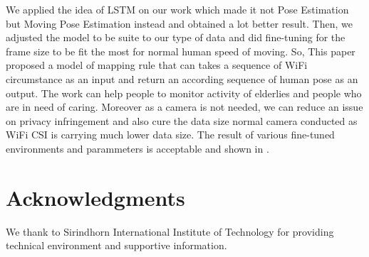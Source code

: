 \documentclass[10pt,letterpaper]{article}
\begin{document}
	
	We applied the idea of LSTM on our work which made it not Pose Estimation but Moving Pose Estimation instead and obtained a lot better result. Then, we adjusted the model to be suite to our type of data and did fine-tuning for the frame size to be fit the most for normal human speed of moving. So, This paper proposed a model of mapping rule that can takes a sequence of WiFi circumstance as an input and return an according sequence of human pose as an output. The work can help people to monitor activity of elderlies and people who are in need of caring. Moreover as a camera is not needed, we can reduce an issue on privacy infringement and also cure the data size normal camera conducted as WiFi CSI is carrying much lower data size.
	The result of various fine-tuned environments and parammeters is acceptable and shown in .
	

	\section*{Acknowledgments}
	We thank to Sirindhorn International Institute of Technology for providing technical environment and supportive information.
	
	
	
	\nolinenumbers
	
\end{document}
